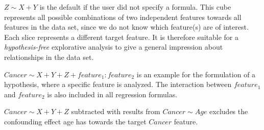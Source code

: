 \documentclass[journal]{style/vgtc} 			          %
\begin{document}
$Z \sim X + Y$ is the default if the user did not specify a formula.
This cube represents all possible combinations of two independent features towards all features in the data set, since we do not know which feature(s) are of interest.
Each slice represents a different target feature.
It is therefore suitable for a \emph{hypothesis-free} explorative analysis to give a general impression about relationships in the data set.

$Cancer \sim X + Y + Z + feature_1:feature_2$ is an example for the formulation of a hypothesis, where a specific feature is analyzed.
The interaction between $feature_1$ and $feature_2$ is also included in all regression formulas.

$Cancer \sim X + Y + Z$ subtracted with results from $Cancer \sim Age$ excludes the confounding effect age has towards the target $Cancer$ feature.
\end{document}
